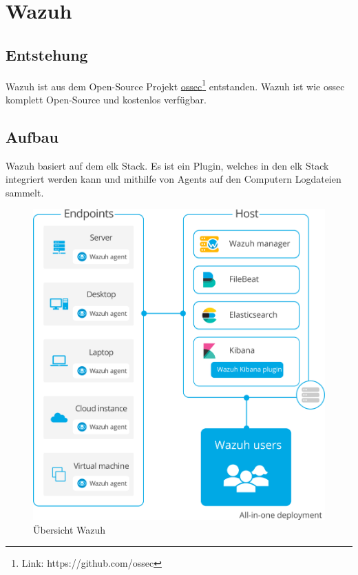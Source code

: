 \chapter{Wazuh}
\section{Entstehung}
Wazuh ist aus dem Open-Source Projekt \href{https://github.com/ossec}{ossec}\footnote{Link: https://github.com/ossec} entstanden.
Wazuh ist wie ossec komplett Open-Source und kostenlos verfügbar.

\section{Aufbau}
Wazuh basiert auf dem \acrfull{elk} Stack. 
Es ist ein Plugin, welches in den \acrshort{elk} Stack integriert werden kann und mithilfe von Agents auf den Computern Logdateien sammelt.

\begin{figure}[H]
    \centering
    \includegraphics[width=\linewidth]{../img/aufbau-wazuh.png}
    \caption[Übersicht Wazuh]{Übersicht Wazuh\footnotemark}
\end{figure}

